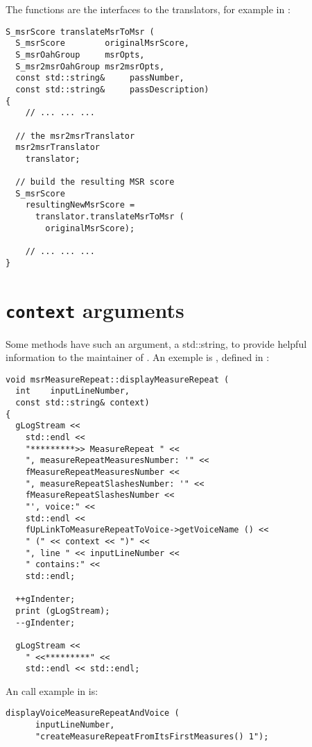 The  functions are the interfaces to the translators, for example in :
\begin{lstlisting}[language=CPlusPlus]
S_msrScore translateMsrToMsr (
  S_msrScore        originalMsrScore,
  S_msrOahGroup     msrOpts,
  S_msr2msrOahGroup msr2msrOpts,
  const std::string&     passNumber,
  const std::string&     passDescription)
{
	// ... ... ...

  // the msr2msrTranslator
  msr2msrTranslator
    translator;

  // build the resulting MSR score
  S_msrScore
    resultingNewMsrScore =
      translator.translateMsrToMsr (
        originalMsrScore);

	// ... ... ...
}
\end{lstlisting}


\section{{\tt context} arguments}

Some methods have such an argument, a std::string, to provide helpful information to the maintainer of \mf. An exemple is , defined in :
\begin{lstlisting}[language=CPlusPlus]
void msrMeasureRepeat::displayMeasureRepeat (
  int    inputLineNumber,
  const std::string& context)
{
  gLogStream <<
    std::endl <<
    "*********>> MeasureRepeat " <<
    ", measureRepeatMeasuresNumber: '" <<
    fMeasureRepeatMeasuresNumber <<
    ", measureRepeatSlashesNumber: '" <<
    fMeasureRepeatSlashesNumber <<
    "', voice:" <<
    std::endl <<
    fUpLinkToMeasureRepeatToVoice->getVoiceName () <<
    " (" << context << ")" <<
    ", line " << inputLineNumber <<
    " contains:" <<
    std::endl;

  ++gIndenter;
  print (gLogStream);
  --gIndenter;

  gLogStream <<
    " <<*********" <<
    std::endl << std::endl;
\end{lstlisting}

An call example in  is:
\begin{lstlisting}[language=CPlusPlus]
    displayVoiceMeasureRepeatAndVoice (
      inputLineNumber,
      "createMeasureRepeatFromItsFirstMeasures() 1");
\end{lstlisting}


